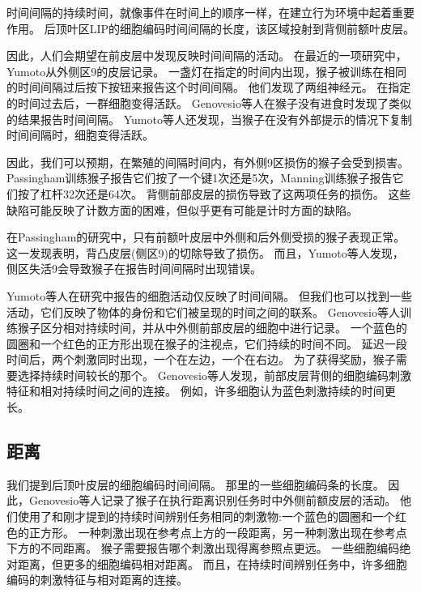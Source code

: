 时间间隔的持续时间，就像事件在时间上的顺序一样，在建立行为环境中起着重要作用。
后顶叶区LIP的细胞编码时间间隔的长度\cite{leon2003representation}，该区域投射到背侧前额叶皮层。


因此，人们会期望在前皮层中发现反映时间间隔的活动。
在最近的一项研究中，Yumoto\cite{yumoto2011neural}从外侧区9的皮层记录。
一盏灯在指定的时间内出现，猴子被训练在相同的时间间隔过后按下按钮来报告这个时间间隔。
他们发现了两组神经元。
在指定的时间过去后，一群细胞变得活跃。
Genovesio等人\cite{genovesio2006neuronal}在猴子没有进食时发现了类似的结果报告时间间隔。
Yumoto等人还发现，当猴子在没有外部提示的情况下复制时间间隔时，细胞变得活跃。


因此，我们可以预期，在繁殖的间隔时间内，有外侧9区损伤的猴子会受到损害。
Passingham\cite{passingham1978information}训练猴子报告它们按了一个键1次还是5次，Manning\cite{manning1978dorsolateral}训练猴子报告它们按了杠杆32次还是64次。
背侧前部皮层的损伤导致了这两项任务的损伤。
这些缺陷可能反映了计数方面的困难，但似乎更有可能是计时方面的缺陷。


在Passingham\cite{passingham1978information}的研究中，只有前额叶皮层中外侧和后外侧受损的猴子表现正常。
这一发现表明，背凸皮层(侧区9)的切除导致了损伤。
而且，Yumoto等人\cite{yumoto2011neural}发现，侧区失活9会导致猴子在报告时间间隔时出现错误。


Yumoto等人在研究中报告的细胞活动仅反映了时间间隔。
但我们也可以找到一些活动，它们反映了物体的身份和它们被呈现的时间之间的联系。
Genovesio等人\cite{genovesio2009feature}训练猴子区分相对持续时间，并从中外侧前部皮层的细胞中进行记录。
一个蓝色的圆圈和一个红色的正方形出现在猴子的注视点，它们持续的时间不同。
延迟一段时间后，两个刺激同时出现，一个在左边，一个在右边。
为了获得奖励，猴子需要选择持续时间较长的那个。
Genovesio等人发现，前部皮层背侧的细胞编码刺激特征和相对持续时间之间的连接。
例如，许多细胞认为蓝色刺激持续的时间更长。


\subsection{距离}

我们提到后顶叶皮层的细胞编码时间间隔\cite{leon2003representation}。
那里的一些细胞编码条的长度\cite{tudusciuc2007neuronal}。
因此，Genovesio等人\cite{genovesio2011prefrontal}记录了猴子在执行距离识别任务时中外侧前额皮层的活动。
他们使用了和刚才提到的持续时间辨别任务相同的刺激物:一个蓝色的圆圈和一个红色的正方形。
一种刺激出现在参考点上方的一段距离，另一种刺激出现在参考点下方的不同距离。
猴子需要报告哪个刺激出现得离参照点更远。
一些细胞编码绝对距离，但更多的细胞编码相对距离。
而且，在持续时间辨别任务中，许多细胞编码的刺激特征与相对距离的连接。


